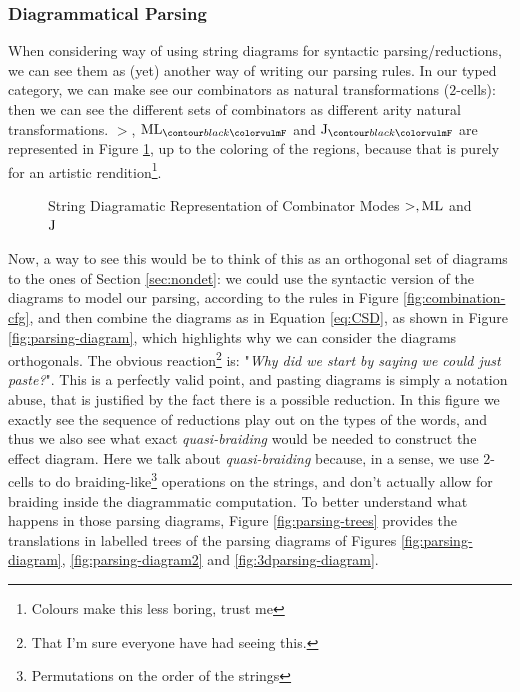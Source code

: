 \subsubsection{Diagrammatical Parsing}
\label{subsubsec:diagram-parsing}
When considering 
way of using string diagrams for syntactic parsing/reductions, we can see them
as (yet) another way of writing our parsing rules.
In our typed category, we can make see our combinators as natural
transformations ($2$-cells): then we can see the different sets of combinators
as different arity natural transformations.
$>$, $\combML_{\f{F}}$ and $\combJ_{\f{F}}$ are represented in
Figure \ref{fig:combinator-sd}, up to the coloring of the regions, because that
is purely for an artistic rendition\footnote{Colours make this less boring,
	trust me}.

\begin{figure}
	\centering
	\caption{String Diagramatic Representation of Combinator Modes $>, \text{ML}$ and $\text{J}$}
	\label{fig:combinator-sd}
\end{figure}

Now, a way to see this would be to think of this as an orthogonal set of
diagrams to the ones of Section \ref{sec:nondet}: we could use the syntactic
version of the diagrams to model our parsing, according to the rules in
Figure \ref{fig:combination-cfg}, and then combine the diagrams as in Equation
\ref{eq:CSD}, as shown in Figure \ref{fig:parsing-diagram}, which highlights
why we can consider the diagrams orthogonals.
The obvious reaction\footnote{That I'm sure everyone have had seeing this.} is:
"\emph{Why did we start by saying we could just paste?}".
This is a perfectly valid point, and pasting diagrams is simply a notation
abuse, that is justified by the fact there is a possible reduction.
In this figure we exactly see the sequence of reductions play out on the types
of the words, and thus we also see what exact \emph{quasi-braiding} would be
needed to construct the effect diagram.
Here we talk about \emph{quasi-braiding} because, in a sense, we use $2$-cells
to do braiding-like\footnote{Permutations on the order of the strings}
operations on the strings, and don't actually allow for braiding inside the
diagrammatic computation.
To better understand what happens in those parsing diagrams, Figure
\ref{fig:parsing-trees} provides the translations in labelled trees of the
parsing diagrams of Figures \ref{fig:parsing-diagram},
\ref{fig:parsing-diagram2} and \ref{fig:3dparsing-diagram}.


